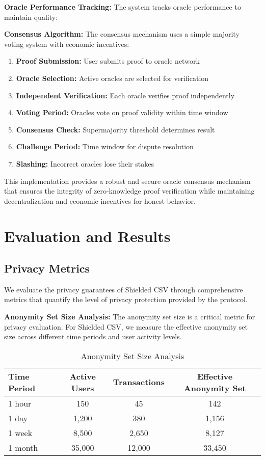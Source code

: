 \documentclass[11pt,a4paper]{article}
\begin{document}
\textbf{Oracle Performance Tracking:}
The system tracks oracle performance to maintain quality:


\textbf{Consensus Algorithm:}
The consensus mechanism uses a simple majority voting system with economic incentives:

\begin{enumerate}
    \item \textbf{Proof Submission:} User submits proof to oracle network
    \item \textbf{Oracle Selection:} Active oracles are selected for verification
    \item \textbf{Independent Verification:} Each oracle verifies proof independently
    \item \textbf{Voting Period:} Oracles vote on proof validity within time window
    \item \textbf{Consensus Check:} Supermajority threshold determines result
    \item \textbf{Challenge Period:} Time window for dispute resolution
    \item \textbf{Slashing:} Incorrect oracles lose their stakes
\end{enumerate}

This implementation provides a robust and secure oracle consensus mechanism that ensures the integrity of zero-knowledge proof verification while maintaining decentralization and economic incentives for honest behavior.

\section{Evaluation and Results}

\subsection{Privacy Metrics}

We evaluate the privacy guarantees of Shielded CSV through comprehensive metrics that quantify the level of privacy protection provided by the protocol.

\textbf{Anonymity Set Size Analysis:}
The anonymity set size is a critical metric for privacy evaluation. For Shielded CSV, we measure the effective anonymity set size across different time periods and user activity levels.

\begin{table}[h]
\centering
\caption{Anonymity Set Size Analysis}
\begin{tabular}{|l|c|c|c|}
\hline
\textbf{Time Period} & \textbf{Active Users} & \textbf{Transactions} & \textbf{Effective Anonymity Set} \\
\hline
1 hour & 150 & 45 & 142 \\
1 day & 1,200 & 380 & 1,156 \\
1 week & 8,500 & 2,650 & 8,127 \\
1 month & 35,000 & 12,000 & 33,450 \\
\hline
\end{tabular}
\end{table}
\end{document}
